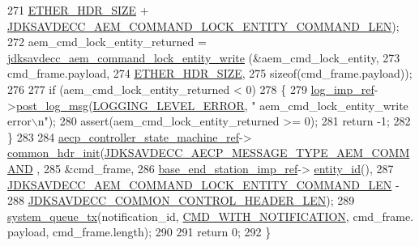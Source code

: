 \begin{DoxyCode}
271                                                         \hyperlink{namespaceavdecc__lib_a6c827b1a0d973e18119c5e3da518e65ca9512ad9b34302ba7048d88197e0a2dc0}{ETHER\_HDR\_SIZE} + 
      \hyperlink{group__command__lock__entity_gaae9fdce1f4e3de3d6a0829b4b077b418}{JDKSAVDECC\_AEM\_COMMAND\_LOCK\_ENTITY\_COMMAND\_LEN});
272     aem\_cmd\_lock\_entity\_returned = \hyperlink{group__command__lock__entity_ga72e701eb5960e2b447364aab20d03b51}{jdksavdecc\_aem\_command\_lock\_entity\_write}
      (&aem\_cmd\_lock\_entity,
273                                                                             cmd\_frame.payload,
274                                                                             
      \hyperlink{namespaceavdecc__lib_a6c827b1a0d973e18119c5e3da518e65ca9512ad9b34302ba7048d88197e0a2dc0}{ETHER\_HDR\_SIZE},
275                                                                             \textcolor{keyword}{sizeof}(cmd\_frame.payload));
276 
277     \textcolor{keywordflow}{if} (aem\_cmd\_lock\_entity\_returned < 0)
278     \{
279         \hyperlink{namespaceavdecc__lib_acbe3e2a96ae6524943ca532c87a28529}{log\_imp\_ref}->\hyperlink{classavdecc__lib_1_1log_a68139a6297697e4ccebf36ccfd02e44a}{post\_log\_msg}(\hyperlink{namespaceavdecc__lib_a501055c431e6872ef46f252ad13f85cdaf2c4481208273451a6f5c7bb9770ec8a}{LOGGING\_LEVEL\_ERROR}, \textcolor{stringliteral}{"
      aem\_cmd\_lock\_entity\_write error\(\backslash\)n"});
280         assert(aem\_cmd\_lock\_entity\_returned >= 0);
281         \textcolor{keywordflow}{return} -1;
282     \}
283 
284     \hyperlink{namespaceavdecc__lib_a0b1b5aea3c0490f77cbfd9178af5be22}{aecp\_controller\_state\_machine\_ref}->
      \hyperlink{classavdecc__lib_1_1aecp__controller__state__machine_aafc737d7ed17a62fed9df6528f18d3ec}{common\_hdr\_init}(\hyperlink{group__aecp__message__type_ga4625ce189cc209f42deb0629f48faf69}{JDKSAVDECC\_AECP\_MESSAGE\_TYPE\_AEM\_COMMAND}
      ,
285                                                        &cmd\_frame,
286                                                        \hyperlink{classavdecc__lib_1_1descriptor__base__imp_a550c969411f5f3b69f55cc139763d224}{base\_end\_station\_imp\_ref}->
      \hyperlink{classavdecc__lib_1_1end__station__imp_a363b6c9664a0d701def9b17863e20ad3}{entity\_id}(),
287                                                        
      \hyperlink{group__command__lock__entity_gaae9fdce1f4e3de3d6a0829b4b077b418}{JDKSAVDECC\_AEM\_COMMAND\_LOCK\_ENTITY\_COMMAND\_LEN} -
288                                                            
      \hyperlink{group__jdksavdecc__avtp__common__control__header_gaae84052886fb1bb42f3bc5f85b741dff}{JDKSAVDECC\_COMMON\_CONTROL\_HEADER\_LEN});
289     \hyperlink{namespaceavdecc__lib_a6dd511685627c0865a3442b539a4e8e9}{system\_queue\_tx}(notification\_id, \hyperlink{namespaceavdecc__lib_aabcadff06aa62be0ce47bc0646823604aba48b8a017e06fb240b650cdea965178}{CMD\_WITH\_NOTIFICATION}, cmd\_frame.
      payload, cmd\_frame.length);
290 
291     \textcolor{keywordflow}{return} 0;
292 \}
\end{DoxyCode}


